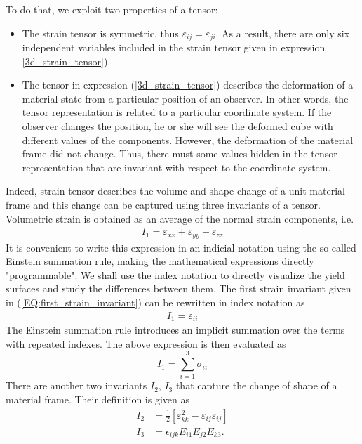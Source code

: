 \documentclass[main.tex]{subfiles}
\begin{document}
To do that, we exploit two properties of a tensor:
\begin{itemize}
\item
The strain tensor is symmetric, thus $\varepsilon_{ij} = \varepsilon_{ji}$. As a result, 
there are only six independent variables included in the strain tensor given in expression \ref{3d_strain_tensor}). 
\item
The tensor in expression (\ref{3d_strain_tensor}) describes the deformation of a material
state from a particular position of an observer. In other words, the
tensor representation is related to a particular coordinate system. If the observer 
changes the position, he or she will see the deformed cube with different values
of the components. However, the deformation of the material frame did not change.
Thus, there must some values hidden in the tensor representation that are invariant
with respect to the coordinate system.
\end{itemize}

Indeed, strain tensor describes the volume and shape change of a unit material frame and this
change can be captured using three invariants of a tensor.
Volumetric strain is obtained as an average of the normal strain components, i.e.
\begin{align}
\label{EQ:first_strain_invariant}
    I_1 =  \varepsilon_{xx} + \varepsilon_{yy} + \varepsilon_{zz}
\end{align}
It is convenient to write this expression in an indicial notation using the so called Einstein summation rule,  making the mathematical expressions directly "programmable". We shall use the index notation to directly visualize the yield surfaces and study the differences between them.
The first strain invariant given in (\ref{EQ:first_strain_invariant}) can be rewritten in index notation as
\begin{align}
\label{eq:I_1}
    I_1 = \varepsilon_{ii}
\end{align}
The Einstein summation rule introduces an implicit summation over the terms with repeated indexes. 
The above expression is then evaluated as
\[
  I_1 = \sum_{i=1}^{3} \sigma_{ii}
\]
There are another two invariants $I_2$, $I_3$ that capture the change of shape of a material frame.
Their definition is given as
\begin{align}
\label{eq:I_2}
I_2 &= \frac{1}{2} \left[ \varepsilon_{kk}^2 - \varepsilon_{ij}\varepsilon_{ij} \right] \\
\label{eq:I_3}
I_3 &= \epsilon_{ijk} E_{i1} E_{j2} E_{k3}.
\end{align}
\end{document}
